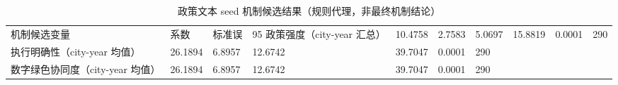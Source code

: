 \begin{table}
\caption{政策文本 seed 机制候选结果（规则代理，非最终机制结论）}
\label{tab:policy_seed_mechanism_candidate}
\begin{tabular}{lllllll}
\toprule
机制候选变量 & 系数 & 标准误 & 95%
\midrule
政策强度（city-year 汇总） & 10.4758 & 2.7583 & 5.0697 & 15.8819 & 0.0001 & 290 \\
执行明确性（city-year 均值） & 26.1894 & 6.8957 & 12.6742 & 39.7047 & 0.0001 & 290 \\
数字绿色协同度（city-year 均值） & 26.1894 & 6.8957 & 12.6742 & 39.7047 & 0.0001 & 290 \\
\bottomrule
\end{tabular}
\end{table}
